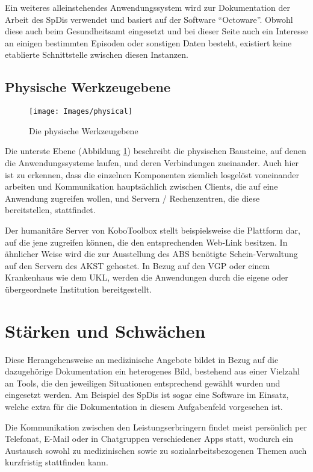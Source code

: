 Ein weiteres alleinstehendes Anwendungssystem wird zur Dokumentation der Arbeit des \acp{SpDi} verwendet und basiert auf der Software \enquote{Octoware}. Obwohl diese auch beim Gesundheitsamt eingesetzt und bei dieser Seite auch ein Interesse an einigen bestimmten Episoden oder sonstigen Daten besteht, existiert keine etablierte Schnittstelle zwischen diesen Instanzen.

\subsection{Physische Werkzeugebene}

\begin{figure}[h]
	\centering
	\texttt{[image: Images/physical]}
	\caption[Physische Werkzeugebene]{Die physische Werkzeugebene}
	\label{fig:physical}
\end{figure}

Die unterste Ebene (Abbildung \ref{fig:physical}) beschreibt die physischen Bausteine, auf denen die Anwendungssysteme laufen, und deren Verbindungen zueinander. Auch hier ist zu erkennen, dass die einzelnen Komponenten ziemlich losgelöst voneinander arbeiten und Kommunikation hauptsächlich zwischen Clients, die auf eine Anwendung zugreifen wollen, und Servern / Rechenzentren, die diese bereitstellen, stattfindet.

Der humanitäre Server von KoboToolbox stellt beispielsweise die Plattform dar, auf die jene zugreifen können, die den entsprechenden Web-Link besitzen. In ähnlicher Weise wird die zur Ausstellung des \ac{ABS} benötigte Schein-Verwaltung auf den Servern des \ac{AKST} gehostet. In Bezug auf den \ac{VGP} oder einem Krankenhaus wie dem \ac{UKL}, werden die Anwendungen durch die eigene oder übergeordnete Institution bereitgestellt.


\section{Stärken und Schwächen}

Diese Herangehensweise an medizinische Angebote bildet in Bezug auf die dazugehörige Dokumentation ein heterogenes Bild, bestehend aus einer Vielzahl an Tools, die den jeweiligen Situationen entsprechend gewählt wurden und eingesetzt werden. Am Beispiel des \acp{SpDi} ist sogar eine Software im Einsatz, welche extra für die Dokumentation in diesem Aufgabenfeld vorgesehen ist.

Die Kommunikation zwischen den Leistungserbringern findet meist persönlich per Telefonat, E-Mail oder in Chatgruppen verschiedener Apps statt, wodurch ein Austausch sowohl zu medizinischen sowie zu sozialarbeitsbezogenen Themen auch kurzfristig stattfinden kann.

